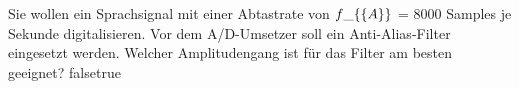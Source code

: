     {Sie wollen ein Sprachsignal mit einer Abtastrate von $f\_\{\textrm\{A\}\}$ = 8000 Samples je Sekunde digitalisieren. Vor dem A/D-Umsetzer soll ein Anti-Alias-Filter eingesetzt werden. Welcher Amplitudengang ist für das Filter am besten geeignet?}
    {}
    {}
    {}
    {}
    {false}{true}